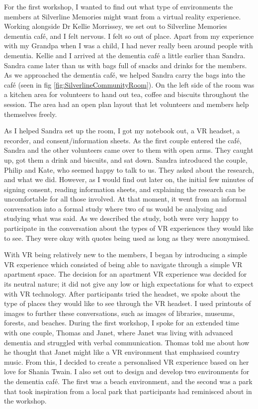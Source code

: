 For the first workshop, I wanted to find out what type of environments the members at Silverline Memories might want from a virtual reality experience. Working alongside Dr Kellie Morrissey, we set out to Silverline Memories dementia café, and I felt nervous. I felt so out of place. Apart from my experience with my Grandpa when I was a child, I had never really been around people with dementia. Kellie and I arrived at the dementia café a little earlier than Sandra. Sandra came later than us with bags full of snacks and drinks for the members. As we approached the dementia café, we helped Sandra carry the bags into the  café (seen in fig \ref{fig:SilverlineCommunityRoom}). On the left side of the room was a kitchen area for volunteers to hand out tea, coffee and biscuits throughout the session. The area had an open plan layout that let volunteers and members help themselves freely. 

As I helped Sandra set up the room, I got my notebook out, a VR headset, a recorder, and consent/information sheets. As the first couple entered the café, Sandra and the other volunteers came over to them with open arms. They caught up, got them a drink and biscuits, and sat down. Sandra introduced the couple, Philip and Kate, who seemed happy to talk to us. They asked about the research, and what we did. However, as I would find out later on, the initial few minutes of signing consent, reading information sheets, and explaining the research can be uncomfortable for all those involved. At that moment, it went from an informal conversation into a formal study where two of us would be analysing and studying what was said. As we described the study, both were very happy to participate in the conversation about the types of VR experiences they would like to see. They were okay with quotes being used as long as they were anonymised.

With VR being relatively new to the members, I began by introducing a simple VR experience which consisted of being able to navigate through a simple VR apartment space. The decision for an apartment VR experience was decided for its neutral nature; it did not give any low or high expectations for what to expect with VR technology. After participants tried the headset, we spoke about the type of places they would like to see through the VR headset. I used printouts of images to further these conversations, such as images of libraries, museums, forests, and beaches. During the first workshop, I spoke for an extended time with one couple, Thomas and Janet, where Janet was living with advanced dementia and struggled with verbal communication. Thomas told me about how he thought that Janet might like a VR environment that emphasised country music. From this, I decided to create a personalised VR experience based on her love for Shania Twain. I also set out to design and develop two environments for the dementia café. The first was a beach environment, and the second was a park that took inspiration from a local park that participants had reminisced about in the workshop.

